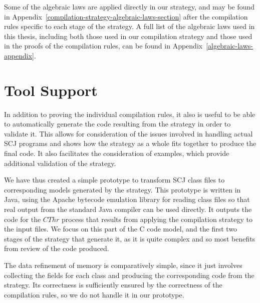 Some of the algebraic laws are applied directly in our strategy, and
may be found in
Appendix~\ref{compilation-strategy-algebraic-laws-section} after the
compilation rules specific to each stage of the strategy.
A full list of the algebraic laws used in this thesis, including both
those used in our compilation strategy and those used in the proofs of
the compilation rules, can be found in
Appendix~\ref{algebraic-laws-appendix}.


\section{Tool Support}
\label{tool-support-section}

In addition to proving the individual compilation rules, it also is
useful to be able to automatically generate the code resulting from
the strategy in order to validate it.
This allows for consideration of the issues involved in handling
actual SCJ programs and shows how the strategy as a whole fits
together to produce the final code.
It also facilitates the consideration of examples, which provide
additional validation of the strategy.

We have thus created a simple prototype to transform SCJ class files
to corresponding \Circus{} models generated by the strategy.
This prototype is written in Java, using the Apache bytecode emulation
library for reading class files so that real output from the standard
Java compiler can be used directly.
It outputs the \Circus{} code for the $CThr$ process that results from
applying the compilation strategy to the input files.
We focus on this part of the C code model, and the first two stages of
the strategy that generate it, as it is quite complex and so most
benefits from review of the code produced.

The data refinement of memory is comparatively simple, since it just
involves collecting the fields for each class and producing the
corresponding \Circus{} code from the strategy.
Its correctness is sufficiently ensured by the correctness of the
compilation rules, so we do not handle it in our prototype.

